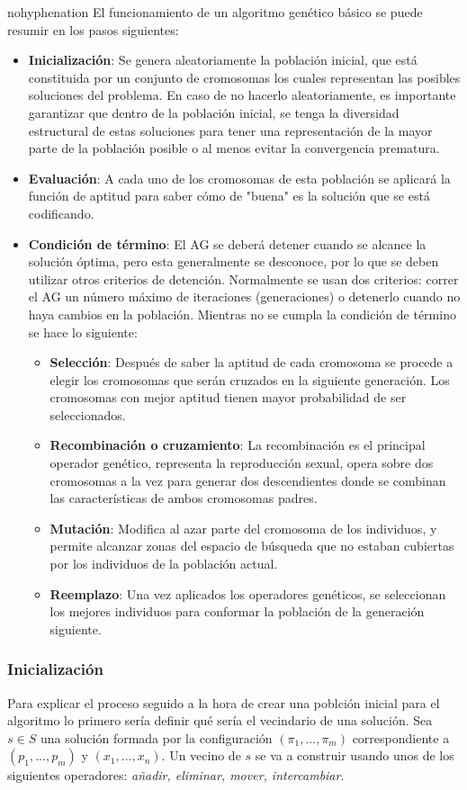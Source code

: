 \documentclass[a4paper,10pt,twocolumn]{article}
\begin{document}
\begin{hyphenrules}{nohyphenation}
El funcionamiento de un algoritmo genético básico se puede resumir en los pasos siguientes:
\begin{itemize}
	\item \textbf{Inicialización}: Se genera aleatoriamente la población inicial, que está constituida por un conjunto de cromosomas los cuales representan las posibles soluciones del problema. En caso de no hacerlo aleatoriamente, es importante garantizar que dentro de la población inicial, se tenga la diversidad estructural de estas soluciones para tener una representación de la mayor parte de la población posible o al menos evitar la convergencia prematura.
	\item \textbf{Evaluación}: A cada uno de los cromosomas de esta población se aplicará la función de aptitud para saber cómo de "buena" es la solución que se está codificando.
	\item \textbf{Condición de término}: El AG se deberá detener cuando se alcance la solución óptima, pero esta generalmente se desconoce, por lo que se deben utilizar otros criterios de detención. Normalmente se usan dos criterios: correr el AG un número máximo de iteraciones (generaciones) o detenerlo cuando no haya cambios en la población. Mientras no se cumpla la condición de término se hace lo siguiente:
	\begin{itemize}
		\item \textbf{Selección}: Después de saber la aptitud de cada cromosoma se procede a elegir los cromosomas que serán cruzados en la siguiente generación. Los cromosomas con mejor aptitud tienen mayor probabilidad de ser seleccionados.
		\item \textbf{Recombinación o cruzamiento}: La recombinación es el principal operador genético, representa la reproducción sexual, opera sobre dos cromosomas a la vez para generar dos descendientes donde se combinan las características de ambos cromosomas padres.
		\item \textbf{Mutación}: Modifica al azar parte del cromosoma de los individuos, y permite alcanzar zonas del espacio de búsqueda que no estaban cubiertas por los individuos de la población actual.
		\item \textbf{Reemplazo}: Una vez aplicados los operadores genéticos, se seleccionan los mejores individuos para conformar la población de la generación siguiente. \cite{5}
	\end{itemize}
\end{itemize}

\subsubsection{Inicialización}\label{init}
Para explicar el proceso seguido a la hora de crear una poblción inicial para el algoritmo lo primero sería definir qué sería el vecindario de una solución. Sea $s \in S$ una solución formada por la configuración $(\pi_1,...,\pi_m)$ correspondiente a $(p_1,...,p_m)$ y $(x_1,...,x_n)$. Un vecino de $s$ se va a construir usando unos de los siguientes operadores: \textit{añadir, eliminar, mover, intercambiar}. 


\end{hyphenrules}
\end{document}
